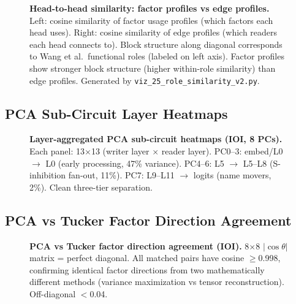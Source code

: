 \documentclass[11pt]{article}
\begin{document}
\begin{figure}[h!]
\centering
\caption{\textbf{Head-to-head similarity: factor profiles vs edge
profiles.} Left: cosine similarity of factor usage profiles (which
factors each head uses). Right: cosine similarity of edge profiles
(which readers each head connects to). Block structure along diagonal
corresponds to Wang et al.\ functional roles (labeled on left axis).
Factor profiles show stronger block structure (higher within-role
similarity) than edge profiles. Generated by
\texttt{viz\_25\_role\_similarity\_v2.py}.}
\end{figure}


\subsection{PCA Sub-Circuit Layer Heatmaps}
\label{fig:pca_layer_heatmaps}

\begin{figure}[h!]
\centering
\caption{\textbf{Layer-aggregated PCA sub-circuit heatmaps (IOI, 8 PCs).}
Each panel: 13$\times$13 (writer layer $\times$ reader layer). PC0--3:
embed/L0 $\to$ L0 (early processing, 47\% variance). PC4--6: L5 $\to$
L5--L8 (S-inhibition fan-out, 11\%). PC7: L9--L11 $\to$ logits (name
movers, 2\%). Clean three-tier separation.}
\end{figure}


\subsection{PCA vs Tucker Factor Direction Agreement}
\label{fig:pca_tucker_agreement}

\begin{figure}[h!]
\centering
\caption{\textbf{PCA vs Tucker factor direction agreement (IOI).}
8$\times$8 $|\cos\theta|$ matrix = perfect diagonal. All matched pairs
have cosine $\geq$0.998, confirming identical factor directions from
two mathematically different methods (variance maximization vs tensor
reconstruction). Off-diagonal $<$0.04.}
\end{figure}
\end{document}
